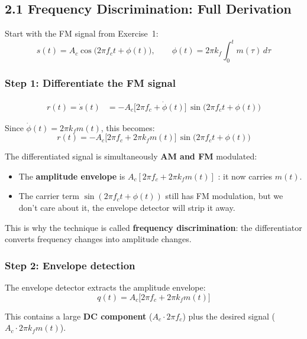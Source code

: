 \documentclass[../../main.tex]{subfiles}
\begin{document}
\vspace{1em}

\subsection{2.1 \; Frequency Discrimination: Full Derivation}

Start with the FM signal from Exercise~1:
\[
  s(t) = A_c \cos\!\big(2\pi f_c t + \phi(t)\big), \qquad \phi(t) = 2\pi k_f \int_0^t m(\tau)\,d\tau
\]

\subsubsection{Step 1: Differentiate the FM signal}

\begin{align}
  r(t) = \dot{s}(t)
  &= -A_c\Big[2\pi f_c + \dot{\phi}(t)\Big]\,\sin\!\big(2\pi f_c t + \phi(t)\big)
\end{align}

Since $\dot{\phi}(t) = 2\pi k_f m(t)$, this becomes:
\[
  r(t) = -A_c\Big[2\pi f_c + 2\pi k_f m(t)\Big]\,\sin\!\big(2\pi f_c t + \phi(t)\big)
\]

\begin{IntuitionBox}
The differentiated signal is simultaneously \textbf{AM and FM} modulated:
\begin{itemize}[leftmargin=1.5em]
  \item The \textbf{amplitude envelope} is $A_c[2\pi f_c + 2\pi k_f m(t)]$ : it now carries $m(t)$.
  \item The carrier term $\sin(2\pi f_c t + \phi(t))$ still has FM modulation, but we don't care about it, the envelope detector will strip it away.
\end{itemize}
This is why the technique is called \textbf{frequency discrimination}: the differentiator converts frequency changes into amplitude changes.
\end{IntuitionBox}

\vspace{0.5em}

\subsubsection{Step 2: Envelope detection}

The envelope detector extracts the amplitude envelope:
\[
  q(t) = A_c\Big[2\pi f_c + 2\pi k_f m(t)\Big]
\]

This contains a large \textbf{DC component} ($A_c \cdot 2\pi f_c$) plus the desired signal ($A_c \cdot 2\pi k_f m(t)$).
\end{document}
